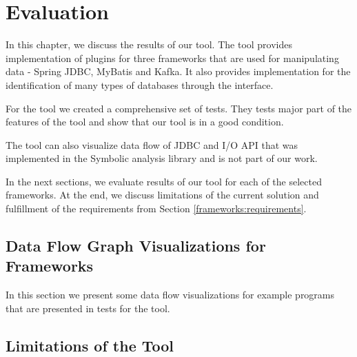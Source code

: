 
\chapter{Evaluation \label{chapter:results}}

In this chapter, we discuss the results of our \ToolName tool.
The tool provides implementation of plugins for three frameworks
that are used for manipulating data - Spring JDBC, MyBatis and Kafka.
It also provides implementation for the identification of many types of databases
through the  interface.

For the \ToolName tool we created a comprehensive set of tests.
They tests major part of the features of the tool and show
that our tool is in a good condition.

The \ToolName tool can also visualize data flow of JDBC and I/O API that was
implemented in the Symbolic analysis library and is not part of our work.

In the next sections, we evaluate results of our \ToolName tool for each of the selected frameworks.
At the end, we discuss limitations of the current solution and fulfillment of
the requirements from Section \ref{frameworks:requirements}.




\section{Data Flow Graph Visualizations for Frameworks}

In this section we present some data flow visualizations
for example programs that are presented in tests for the \ToolName tool.




\section{Limitations of the \ToolName Tool \label{chapter:results:limits}}

